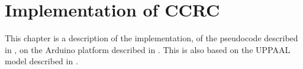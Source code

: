 \chapter{Implementation of CCRC}
This chapter is a description of the implementation, of the pseudocode described in , on the Arduino platform described in . 
This is also based on the UPPAAL model described in .
